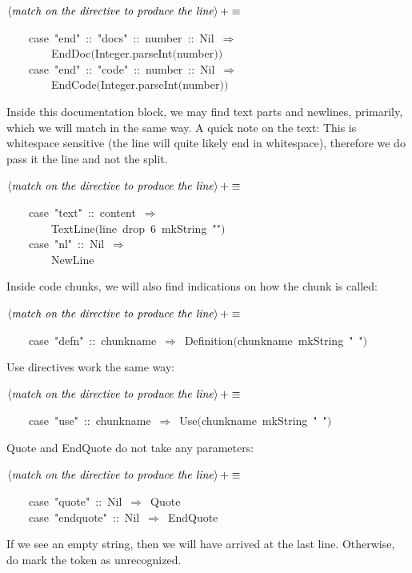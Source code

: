 \documentclass[a4paper,12pt]{article}
\begin{document}
$\left<\mbox{\emph{match on the directive to produce the line}}\right>+\equiv$
\begin{program}~~~~{\vem case}~"end"~{\rm :}{\rm :}~"docs"~{\rm :}{\rm :}~number~{\rm :}{\rm :}~Nil~$\Rightarrow$
\\~~~~~~~~EndDoc$($Integer.parseInt$($number$)$$)$
\\~~~~{\vem case}~"end"~{\rm :}{\rm :}~"code"~{\rm :}{\rm :}~number~{\rm :}{\rm :}~Nil~$\Rightarrow$
\\~~~~~~~~EndCode$($Integer.parseInt$($number$)$$)$
\\[0.5em]\end{program}
Inside this documentation block, we may find text parts and newlines, primarily,
which we will match in the same way. A quick note on the text: This is whitespace
sensitive (the line will quite likely end in whitespace), therefore we do pass
it the line and not the split.

$\left<\mbox{\emph{match on the directive to produce the line}}\right>+\equiv$
\begin{program}~~~~{\vem case}~"text"~{\rm :}{\rm :}~content~$\Rightarrow$
\\~~~~~~~~TextLine$($line~drop~6~mkString~""$)$
\\~~~~{\vem case}~"nl"~{\rm :}{\rm :}~Nil~$\Rightarrow$
\\~~~~~~~~NewLine
\\[0.5em]\end{program}
Inside code chunks, we will also find indications on how the chunk is called:

$\left<\mbox{\emph{match on the directive to produce the line}}\right>+\equiv$
\begin{program}~~~~{\vem case}~"defn"~{\rm :}{\rm :}~chunkname~$\Rightarrow$~Definition$($chunkname~mkString~"~"$)$
\\[0.5em]\end{program}
Use directives work the same way:

$\left<\mbox{\emph{match on the directive to produce the line}}\right>+\equiv$
\begin{program}~~~~{\vem case}~"use"~{\rm :}{\rm :}~chunkname~$\Rightarrow$~Use$($chunkname~mkString~"~"$)$
\\[0.5em]\end{program}
Quote and EndQuote do not take any parameters:

$\left<\mbox{\emph{match on the directive to produce the line}}\right>+\equiv$
\begin{program}~~~~{\vem case}~"quote"~{\rm :}{\rm :}~Nil~$\Rightarrow$~Quote
\\~~~~{\vem case}~"endquote"~{\rm :}{\rm :}~Nil~$\Rightarrow$~EndQuote
\\[0.5em]\end{program}
If we see an empty string, then we will have arrived at the last line.
Otherwise, do mark the token as unrecognized.
\end{document}

